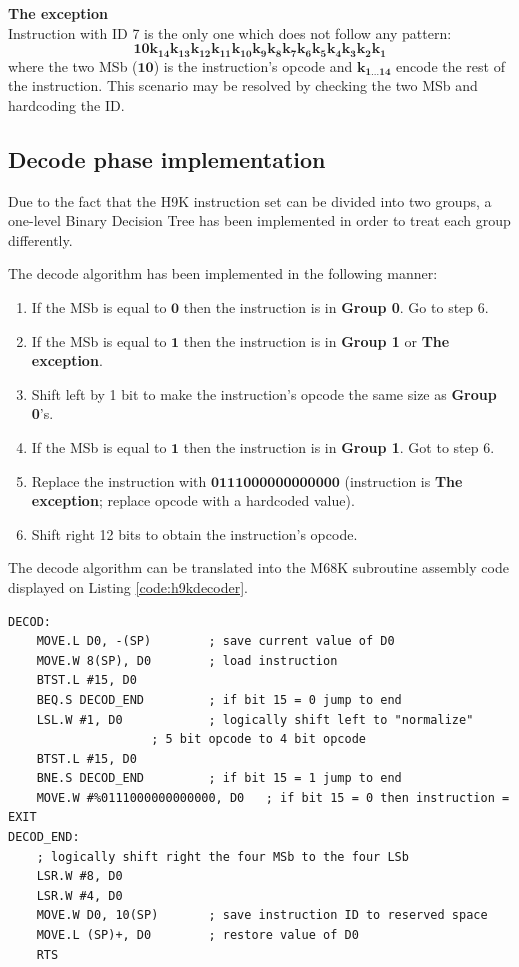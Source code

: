 \documentclass[11pt, a4paper]{article}
\begin{document}
\noindent\textbf{The exception} \\
Instruction with ID 7 is the only one which does not follow any pattern:
\begin{equation*}
	\mathbf{10k_{14}k_{13}k_{12}k_{11}k_{10}k_9k_8k_7k_6k_5k_4k_3k_2k_1}
\end{equation*}
where the two MSb ($\mathbf{10}$) is the instruction's opcode and $\mathbf{k_{1 \ldots 14}}$ encode
the rest of the instruction. This scenario may be resolved by checking the two MSb and hardcoding
the ID.

\subsection{Decode phase implementation}
Due to the fact that the H9K instruction set can be divided into two groups, a one-level Binary Decision
Tree has been implemented in order to treat each group differently.

The decode algorithm has been implemented in the following manner:
\begin{enumerate}
	\item If the MSb is equal to $\mathbf{0}$ then the instruction is in \textbf{Group 0}. Go to
		step 6.
	\item If the MSb is equal to $\mathbf{1}$ then the instruction is in \textbf{Group 1} or
		\textbf{The exception}.
	\item Shift left by 1 bit to make the instruction's opcode the same size as \textbf{Group 0}'s.
	\item If the MSb is equal to $\mathbf{1}$ then the instruction is in \textbf{Group 1}. Got to
		step 6.
	\item Replace the instruction with $\mathbf{0111000000000000}$ (instruction is \textbf{The
		exception}; replace opcode with a hardcoded value).
	\item Shift right 12 bits to obtain the instruction's opcode.
\end{enumerate}
The decode algorithm can be translated into the M68K subroutine assembly code displayed on Listing
\ref{code:h9kdecoder}.
\begin{lstlisting}[style=customasm, caption={HAL9000 instruction decoder subroutine}, label={code:h9kdecoder}]
DECOD:
	MOVE.L D0, -(SP)		; save current value of D0
	MOVE.W 8(SP), D0		; load instruction
	BTST.L #15, D0
	BEQ.S DECOD_END			; if bit 15 = 0 jump to end
	LSL.W #1, D0			; logically shift left to "normalize"
					; 5 bit opcode to 4 bit opcode
	BTST.L #15, D0
	BNE.S DECOD_END			; if bit 15 = 1 jump to end
	MOVE.W #%0111000000000000, D0	; if bit 15 = 0 then instruction = EXIT
DECOD_END:
	; logically shift right the four MSb to the four LSb
	LSR.W #8, D0
	LSR.W #4, D0
	MOVE.W D0, 10(SP)		; save instruction ID to reserved space
	MOVE.L (SP)+, D0		; restore value of D0
	RTS
\end{lstlisting}
\end{document}

